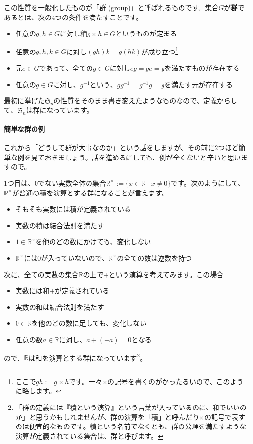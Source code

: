 この性質を一般化したものが「群 (group)」と呼ばれるものです。集合$G$が\textbf{群}であるとは、次の$4$つの条件を満たすことです。
\begin{itemize}
\item 任意の$g, h \in G$に対し積$g \times h \in G$というものが定まる
\item 任意の$g, h, k \in G$に対し$(gh)k = g(hk)$が成り立つ\footnote{ここで$gh := g \times h$です。一々$\times$の記号を書くのがかったるいので、このように略します。}
\item 元$e \in G$であって、全ての$g \in G$に対し$eg = ge = g$を満たすものが存在する
\item 任意の$g \in G$に対し、$g^{-1}$という、$g g^{-1} = g^{-1} g = g$を満たす元が存在する
\end{itemize}
最初に挙げた$\mathfrak{S}_n$の性質をそのまま書き変えたようなものなので、定義からして、$\mathfrak{S}_n$は群になっています。

\paragraph{簡単な群の例} これから「どうして群が大事なのか」という話をしますが、その前に$2$つほど簡単な例を見ておきましょう。話を進めるにしても、例が全くないと辛いと思いますので。

$1$つ目は、$0$でない実数全体の集合$\mathbb{R}^{\times} := \{ x \in \mathbb{R} \mid x \neq 0\}$です。次のようにして、$\mathbb{R}^{\times}$が普通の積を演算とする群になることが言えます。
\begin{itemize}
\item そもそも実数には積が定義されている
\item 実数の積は結合法則を満たす
\item $1 \in \mathbb{R}^{\times}$を他のどの数にかけても、変化しない
\item $\mathbb{R}^{\times}$には$0$が入っていないので、$\mathbb{R}^{\times}$の全ての数は逆数を持つ
\end{itemize}

次に、全ての実数の集合$\mathbb{R}$の上で$+$という演算を考えてみます。この場合
\begin{itemize}
\item 実数には和$+$が定義されている
\item 実数の和は結合法則を満たす
\item $0 \in \mathbb{R}$を他のどの数に足しても、変化しない
\item 任意の数$a \in \mathbb{R}$に対し、$a + (-a) = 0$となる
\end{itemize}
ので、$\mathbb{R}$は和を演算とする群になっています\footnote{「群の定義には『積という演算』という言葉が入っているのに、和でいいのか」と思うかもしれませんが、群の演算を「積」と呼んだり$\times$の記号で表すのは便宜的なものです。積という名前でなくとも、群の公理を満たすような演算が定義されている集合は、群と呼びます。}。

